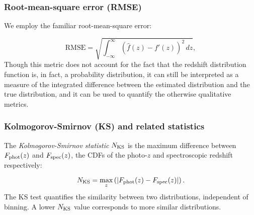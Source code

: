 \subsubsection{Root-mean-square error (RMSE)}
\label{sec:rmse}

We employ the familiar root-mean-square error:

\begin{equation}
\mathrm{RMSE} = \sqrt{\int_{-\infty}^{\infty}\left(\hat{f}(z)-f'(z)\right)^{2}\,dz},
\end{equation}
Though this metric does not account for the fact that the redshift distribution function is, in fact, a probability distribution, it can still be interpreted as a measure of the integrated difference between the estimated distribution and the true distribution, and it can be used to quantify the otherwise qualitative metrics.


\subsubsection{Kolmogorov-Smirnov (KS) and related statistics}
\label{sec:ks}

The \textit{Kolmogorov-Smirnov statistic} $N_{\rm KS}$ is the maximum difference between $F_{\rm phot}(z)$ and $F_{\rm spec}(z)$, the CDFs of the photo-$z$ and spectroscopic redshift respectively:

\begin{equation}
N_{\rm KS} = \max_{z}\left( \left| F_{\rm phot}(z) - F_{\rm spec}(z) \right| \right).
\end{equation}
The KS test quantifies the similarity between two distributions, independent of binning.
A lower $N_{\rm KS}$ value corresponds to more similar distributions.

